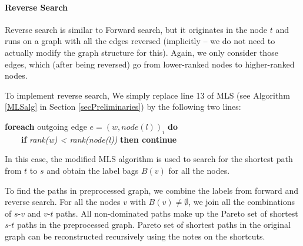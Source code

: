 \paragraph*{Reverse Search}
Reverse search is similar to Forward search, but it originates in the node $t$ and runs on a graph with all the edges reversed (implicitly -- we do not need to actually modify the graph structure for this). Again, we only consider those edges, which (after being reversed) go from lower-ranked nodes to higher-ranked nodes. 
\vskip 3mm

\noindent To implement reverse search, We simply replace line 13 of MLS (see Algorithm \ref{MLSalg} in Section \ref{secPreliminaries}) by the following two lines:
\vskip 5mm

{\bf foreach} outgoing edge $e=(w,node(l))_i$ {\bf do}\\
\indent \ \ \ \ {\bf if} {\em rank(w) < rank(node(l))} {\bf then continue} 

\vskip 5mm
\noindent In this case, the modified MLS algorithm is used to search for the shortest path from $t$ to $s$ and obtain the label bags $B(v)$ for all the nodes.

%

To find the paths in preprocessed graph, we combine the labels from forward and reverse search. 
For all the nodes $v$ with $B(v) \ne \emptyset$, we join all the combinations of $s$-$v$ and $v$-$t$ paths. 
All non-dominated paths make up the Pareto set of shortest $s$-$t$ paths in the preprocessed graph.
Pareto set of shortest paths in the original graph can be reconstructed recursively using the notes on the shortcuts.

